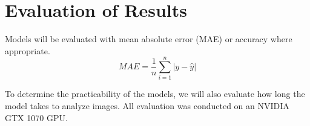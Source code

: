 \chapter{Evaluation of Results}


Models will be evaluated with mean absolute error (MAE) or accuracy where appropriate.
\begin{equation} MAE = \frac{1}{n} \sum_{i=1}^{n} |y-\hat{y}| \end{equation}

To determine the practicability of the models, we will also evaluate how long the model takes to analyze images. All evaluation was conducted on an NVIDIA GTX 1070 GPU.